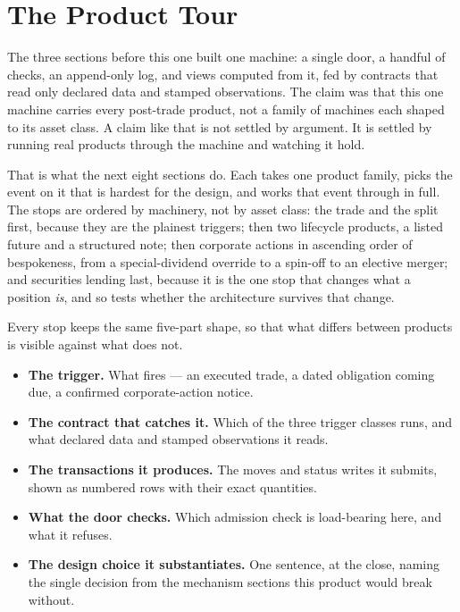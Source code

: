 \section{The Product Tour}\label{sec:tour}

The three sections before this one built one machine: a single door, a handful of
checks, an append-only log, and views computed from it, fed by contracts that read
only declared data and stamped observations. The claim was that this one machine
carries every post-trade product, not a family of machines each shaped to its asset
class. A claim like that is not settled by argument. It is settled by running real
products through the machine and watching it hold.

That is what the next eight sections do. Each takes one product family, picks the
event on it that is hardest for the design, and works that event through in full.
The stops are ordered by machinery, not by asset class: the trade and the split
first, because they are the plainest triggers; then two lifecycle products, a listed
future and a structured note; then corporate actions in ascending order of
bespokeness, from a special-dividend override to a spin-off to an elective merger;
and securities lending last, because it is the one stop that changes what a position
\emph{is}, and so tests whether the architecture survives that change.

Every stop keeps the same five-part shape, so that what differs between products is
visible against what does not.

\begin{itemize}[leftmargin=1.5em]
\item \textbf{The trigger.} What fires --- an executed trade, a dated obligation
coming due, a confirmed corporate-action notice.
\item \textbf{The contract that catches it.} Which of the three trigger classes runs,
and what declared data and stamped observations it reads.
\item \textbf{The transactions it produces.} The moves and status writes it submits,
shown as numbered rows with their exact quantities.
\item \textbf{What the door checks.} Which admission check is load-bearing here, and
what it refuses.
\item \textbf{The design choice it substantiates.} One sentence, at the close, naming
the single decision from the mechanism sections this product would break without.
\end{itemize}

